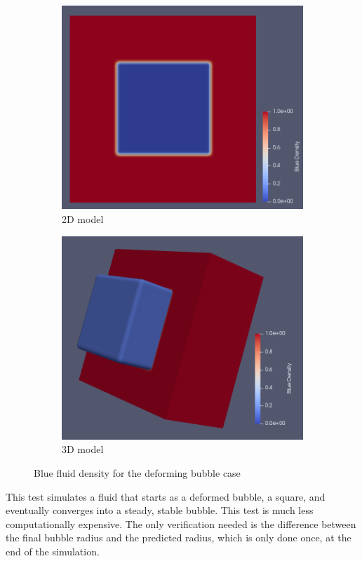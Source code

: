 \documentclass[12pt]{book}
\begin{document}
\begin{figure}[H]
	\centering
	\begin{subfigure}{.49\textwidth}
		\includegraphics[width=\linewidth]{Resources/Images/square.png}
		\caption{2D model}
	\end{subfigure}
	\begin{subfigure}{.49\textwidth}
		\includegraphics[width=\linewidth]{Resources/Images/square3D.png}
		\caption{3D model}
	\end{subfigure} 
	\caption{Blue fluid density for the deforming bubble case}
	\label{fig:deforming}
\end{figure} 
This test simulates a fluid that starts as a deformed bubble, a square, and eventually converges into a steady, stable bubble. This test is much less computationally expensive. The only verification needed is the difference between the final bubble radius and the predicted radius, which is only done once, at the end of the simulation.  
\end{document}
